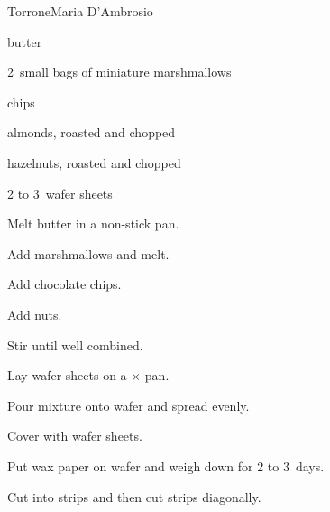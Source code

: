 \begin{recipe}{Torrone}{Maria D'Ambrosio}{}

\begin{ingredients}
\item \C{\threequarter} butter
\item 2~small bags of miniature marshmallows
\item \C{2\half}  chips
\item {} almonds, roasted and chopped
\item {} hazelnuts, roasted and chopped
\item 2 to 3~wafer sheets
\end{ingredients}

\begin{directions}
\item Melt butter in a non-stick pan.
\item Add marshmallows and melt.
\item Add chocolate chips.
\item Add nuts.
\item Stir until well combined.
\item Lay wafer sheets on a $\times$ pan.
\item Pour mixture onto wafer and spread evenly.
\item Cover with wafer sheets.
\item Put wax paper on wafer and weigh down for 2 to 3~days.
\item Cut into strips and then cut strips diagonally.
\end{directions}

\end{recipe}
